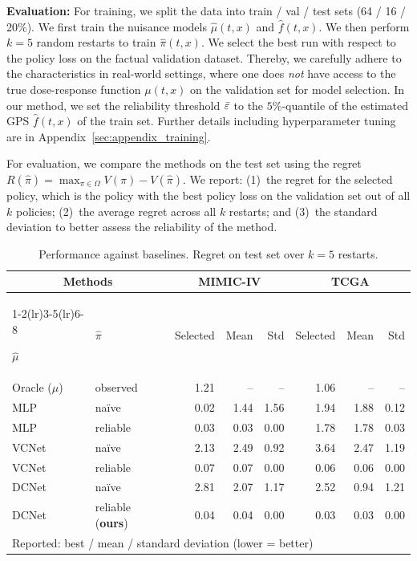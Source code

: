 \documentclass{article}
\theoremstyle{definition}
\theoremstyle{plain}
\begin{document}
\textbf{Evaluation:} For training, we split the data into train / val / test sets (64 / 16 / 20\%). We first train the nuisance models $\hat{\mu}(t, x)$ and $\hat{f}(t, x)$. We then perform $k=5$ random restarts to train $\hat{\pi}(t, x)$. We select the best run with respect to the policy loss on the factual validation dataset. Thereby, we carefully adhere to the characteristics in real-world settings, where one does \emph{not} have access to the true dose-response function $\mu(t, x)$ on the validation set for model selection. In our method, we set the reliability threshold $\Bar{\varepsilon}$ to the $5\%$-quantile of the estimated GPS $\hat{f}(t, x)$ of the train set. Further details including hyperparameter tuning are in Appendix~\ref{sec:appendix_training}.  

For evaluation, we compare the methods on the test set using the regret $R(\hat{\pi}) = \max_{\pi \in \Omega} \! V(\pi) - V(\hat{\pi})$. We report: (1)~the regret for the selected policy, which is the policy with the best policy loss on the validation set out of all $k$ policies; (2)~the average regret across all $k$ restarts; and (3)~the standard deviation to better assess the reliability of the method. 

\begin{table}
\vspace{-0.4cm}
\centering
\scriptsize
\begin{tabular}{ll|rrr|rrr}
\toprule

 \multicolumn{2}{c}{\textbf{Methods}} & \multicolumn{3}{c}{\textbf{MIMIC-IV}} & \multicolumn{3}{c}{\textbf{TCGA}} \\
 \cmidrule(lr){1-2}\cmidrule(lr){3-5}\cmidrule(lr){6-8}

 $\hat{\mu}$ &   $\hat{\pi}$ &  Selected  &  Mean &  Std &  Selected  &  Mean &  Std  \\
\midrule
Oracle ($\mu$) & observed &  1.21 & -- & --  &    1.06 &  -- & -- \\
\midrule
MLP  &    na{\"i}ve &    0.02   & 1.44 & 1.56 &    1.94 &  1.88 & 0.12\\
MLP  & reliable &    0.03  &   0.03 & 0.00 &    1.78 &  1.78 & 0.03 \\
 \midrule
VCNet &               na{\"i}ve  &   2.13 & 2.49 & 0.92 & 3.64 & 2.47 & 1.19\\
VCNet &            reliable &   0.07 & 0.07 & 0.00 &   0.06 & 0.06 & 0.00\\
\midrule
DCNet  &    na{\"i}ve &   2.81 &  2.07 & 1.17  &    2.52 &  0.94 & 1.21\\
DCNet  & reliable (\textbf{ours}) &   0.04  &  0.04 & 0.00 &    0.03 &  0.03 & 0.00  \\
\bottomrule
\multicolumn{8}{l}{Reported: best / mean / standard deviation (lower = better)}
\end{tabular}
\caption{Performance against baselines. Regret on test set over $k=5$ restarts.}
\label{tab:results}
\vspace{-0.4cm}
\end{table}
\end{document}

